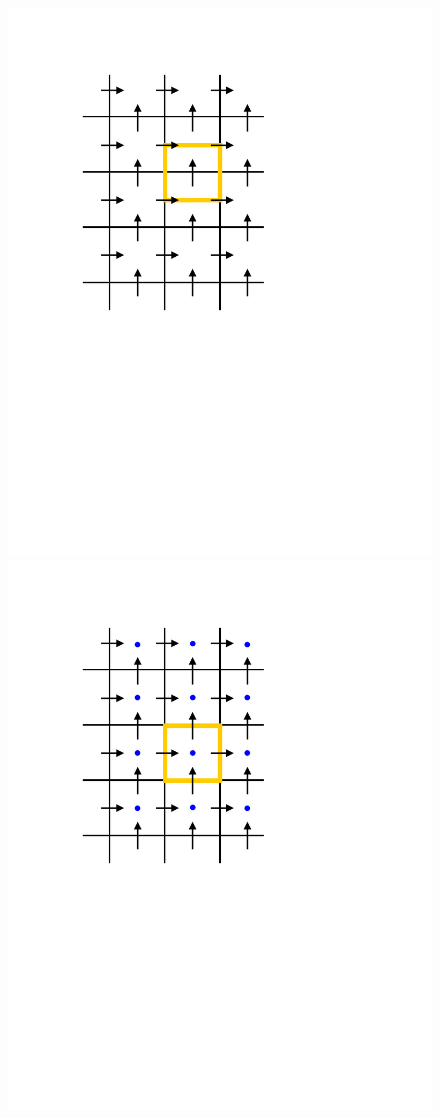 \begin{figure}[htbp]
\includegraphics[scale=0.47]{../figures/Grids/Staggered-CV-w.pdf}
\hspace{0.3in}
\includegraphics[scale=0.47]{../figures/Grids/Staggered-CV-scalar.pdf}

\end{figure}
